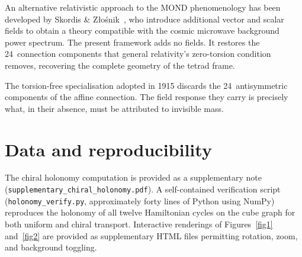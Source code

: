 \documentclass[twocolumn]{iopjournal}
\begin{document}
An alternative relativistic approach to the MOND phenomenology
has been developed by Skordis \&
Z\l{}o\'{s}nik~\cite{SkordisZlosnik2021}, who introduce
additional vector and scalar fields to obtain a theory
compatible with the cosmic microwave background power spectrum.
The present framework adds no fields.  It restores the
24~connection components that general relativity's zero-torsion
condition removes, recovering the complete geometry of the
tetrad frame.

The torsion-free specialisation adopted in 1915 discards the
24~antisymmetric components of the affine connection.  The
field response they carry is precisely what, in their absence,
must be attributed to invisible mass.


\section{Data and reproducibility}

The chiral holonomy computation is provided as a supplementary
note (\texttt{supplementary\_chiral\_holonomy.pdf}).  A
self-contained verification script
(\texttt{holonomy\_verify.py}, approximately forty lines of
Python using NumPy) reproduces the holonomy of all twelve
Hamiltonian cycles on the cube graph for both uniform and
chiral transport.  Interactive renderings of
Figures~\ref{fig1} and~\ref{fig2} are provided as
supplementary HTML files permitting rotation, zoom, and
background toggling.

\end{document}
